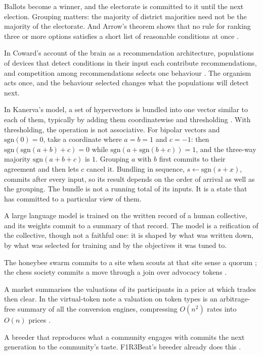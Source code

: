 \documentclass[11pt,a4paper]{article}
\begin{document}
\begin{description}[leftmargin=1.2em,itemsep=4pt,font=\normalfont\spartansemi]
\item[Voting.] Ballots become a winner, and the electorate is committed to it until the next
  election. Grouping matters: the majority of district majorities need not be the majority of the
  electorate. And Arrow's theorem shows that no rule for ranking three or more options satisfies a
  short list of reasonable conditions at once \cite{arrow}.
\item[The brain.] In Coward's account of the brain as a recommendation architecture, populations of
  devices that detect conditions in their input each contribute recommendations, and competition
  among recommendations selects one behaviour \cite{coward}. The organism acts once, and the
  behaviour selected changes what the populations will detect next.
\item[Bundling in hyperdimensional computing.] In Kanerva's model, a set of hypervectors is
  bundled into one vector similar to each of them, typically by adding them coordinatewise and
  thresholding \cite{kanerva}. With thresholding, the operation is not associative. For bipolar
  vectors and $\mathrm{sgn}(0)=0$, take a coordinate where $a=b=1$ and $c=-1$: then
  $\mathrm{sgn}(\mathrm{sgn}(a+b)+c)=0$ while $\mathrm{sgn}(a+\mathrm{sgn}(b+c))=1$, and the three-way
  majority $\mathrm{sgn}(a+b+c)$ is $1$. Grouping $a$ with $b$ first commits to their agreement and
  then lets $c$ cancel it. Bundling in sequence, $s \leftarrow \mathrm{sgn}(s+x)$, commits after
  every input, so its result depends on the order of arrival as well as the grouping. The bundle is
  not a running total of its inputs. It is a state that has committed to a particular view of
  them.
\item[Averaging over a corpus.] A large language model is trained on the written record of a
  human collective, and its weights commit to a summary of that record. The model is a
  reification of the collective, though not a faithful one: it is shaped by what was written down,
  by what was selected for training and by the objectives it was tuned to.
\item[Quorum.] The honeybee swarm commits to a site when scouts at that site sense a quorum
  \cite{seeley}; the chess society commits a move through a join over advocacy tokens
  \cite{chess-note}.
\item[Price.] A market summarises the valuations of its participants in a price at which trades
  then clear. In the virtual-token note a valuation on token types is an arbitrage-free summary of
  all the conversion engines, compressing $O(n^2)$ rates into $O(n)$ prices \cite{virtual-token}.
\item[Selection.] A breeder that reproduces what a community engages with commits the next
  generation to the community's taste. F1R3Beat's breeder already does this \cite{beat-design}.
\end{description}
\end{document}
